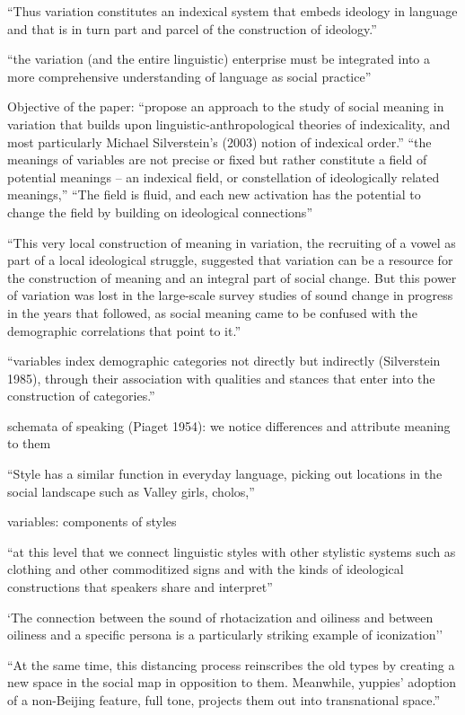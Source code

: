 ``Thus variation constitutes an indexical system
that embeds ideology in language and that is in turn part and parcel of the
construction of ideology.''

``the variation (and the entire linguistic) enterprise must
be integrated into a more comprehensive understanding of language as social
practice''

Objective of the paper:
``propose an approach to the study of social meaning in variation that builds
upon linguistic-anthropological theories of indexicality, and most particularly
Michael Silverstein’s (2003) notion of indexical order.''
``the meanings
of variables are not precise or fixed but rather constitute a field of potential
meanings – an indexical field, or constellation of ideologically related meanings,''
``The field is fluid, and each new activation has the potential to change the field by
building on ideological connections''

``This very local construction of meaning in variation, the recruiting of
a vowel as part of a local ideological struggle, suggested that variation can be a
resource for the construction of meaning and an integral part of social change. But
this power of variation was lost in the large-scale survey studies of sound change
in progress in the years that followed, as social meaning came to be confused
with the demographic correlations that point to it.''

``variables index demographic categories not directly but indirectly (Silverstein
1985), through their association with qualities and stances that enter into the
construction of categories.''

schemata of speaking (Piaget 1954): we notice differences and attribute meaning to them

``Style has a similar function in everyday language,
picking out locations in the social landscape such as Valley girls, cholos,''

variables: components of styles

``at this level that we connect linguistic styles with other stylistic systems
such as clothing and other commoditized signs and with the kinds of ideological
constructions that speakers share and interpret''

`The connection between the sound of rhotacization and oiliness and
between oiliness and a specific persona is a particularly striking example
of iconization''

``At the same time,
this distancing process reinscribes the old types by creating a new space
in the social map in opposition to them. Meanwhile, yuppies’ adoption
of a non-Beijing feature, full tone, projects them out into transnational
space.''

